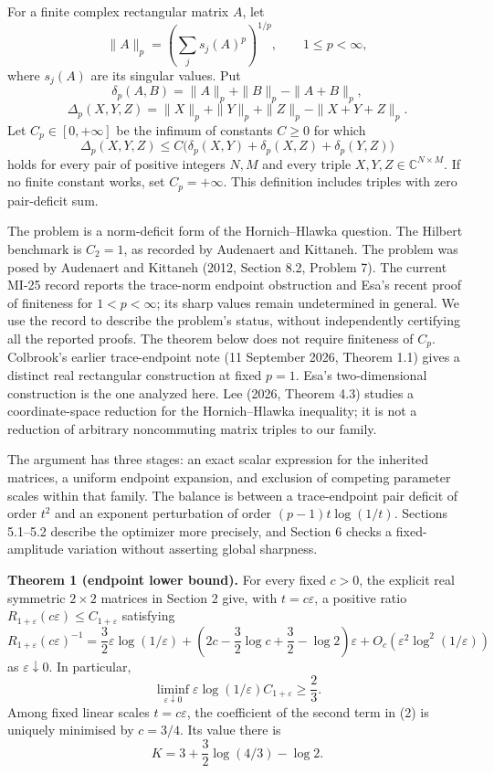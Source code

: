 \documentclass[11pt,a4paper]{article}
\begin{document}
For a finite complex rectangular matrix \(A\), let \[
\|A\|_p=\left(\sum_j s_j(A)^p\right)^{1/p},\qquad 1\le p<\infty,
\] where \(s_j(A)\) are its singular values. Put \[
\delta_p(A,B)=\|A\|_p+\|B\|_p-\|A+B\|_p,
\] \[
\Delta_p(X,Y,Z)=\|X\|_p+\|Y\|_p+\|Z\|_p-\|X+Y+Z\|_p.
\] Let \(C_p\in[0,+\infty]\) be the infimum of constants \(C\ge0\) for which \[
\Delta_p(X,Y,Z)\le C\bigl(\delta_p(X,Y)+\delta_p(X,Z)+\delta_p(Y,Z)\bigr) \tag{1}
\] holds for every pair of positive integers \(N,M\) and every triple \(X,Y,Z\in\mathbb C^{N\times M}\). If no finite constant works, set \(C_p=+\infty\). This definition includes triples with zero pair-deficit sum.

The problem is a norm-deficit form of the Hornich--Hlawka question. The Hilbert benchmark is \(C_2=1\), as recorded by Audenaert and Kittaneh. The problem was posed by Audenaert and Kittaneh (2012, Section 8.2, Problem 7). The current MI-25 record reports the trace-norm endpoint obstruction and Esa's recent proof of finiteness for \(1<p<\infty\); its sharp values remain undetermined in general. We use the record to describe the problem's status, without independently certifying all the reported proofs. The theorem below does not require finiteness of \(C_p\). Colbrook's earlier trace-endpoint note (11 September 2026, Theorem 1.1) gives a distinct real rectangular construction at fixed \(p=1\). Esa's two-dimensional construction is the one analyzed here. Lee (2026, Theorem 4.3) studies a coordinate-space reduction for the Hornich--Hlawka inequality; it is not a reduction of arbitrary noncommuting matrix triples to our family.

The argument has three stages: an exact scalar expression for the inherited matrices, a uniform endpoint expansion, and exclusion of competing parameter scales within that family. The balance is between a trace-endpoint pair deficit of order \(t^2\) and an exponent perturbation of order \((p-1)t\log(1/t)\). Sections 5.1--5.2 describe the optimizer more precisely, and Section 6 checks a fixed-amplitude variation without asserting global sharpness.

\textbf{Theorem 1 (endpoint lower bound).} For every fixed \(c>0\), the explicit real symmetric \(2\times2\) matrices in Section 2 give, with \(t=c\varepsilon\), a positive ratio \(R_{1+\varepsilon}(c\varepsilon)\le C_{1+\varepsilon}\) satisfying \[
R_{1+\varepsilon}(c\varepsilon)^{-1}
=\frac32\varepsilon\log(1/\varepsilon)
+\left(2c-\frac32\log c+\frac32-\log2\right)\varepsilon
+O_c\!\left(\varepsilon^2\log^2(1/\varepsilon)\right) \tag{2}
\] as \(\varepsilon\downarrow0\). In particular, \[
\liminf_{\varepsilon\downarrow0}\varepsilon\log(1/\varepsilon)C_{1+\varepsilon}\ge\frac23. \tag{3}
\] Among fixed linear scales \(t=c\varepsilon\), the coefficient of the second term in (2) is uniquely minimised by \(c=3/4\). Its value there is \[
K=3+\frac32\log(4/3)-\log2. \tag{4}
\]
\end{document}
